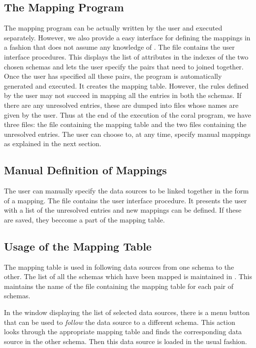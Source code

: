 \subsection{The Mapping Program}

The  mapping program can be actually written by the user
and executed separately. However, we also provide a easy interface for
defining the mappings in a fashion that does not assume any knowledge
of .  The file  contains the user
interface procedures.  This displays the list of attributes in the
indexes of the two chosen schemas and lets the user specify the pairs
that need to joined together. Once the user has specified all these
pairs, the  program is automatically generated and
executed.  It creates the mapping table. However, the rules defined by
the user may not succeed in mapping all the entries in both the
schemas. If there are any unresolved entries, these are dumped into
files whose names are given by the user. Thus at the end of the
execution of the coral program, we have three files: the file
containing the mapping table and the two files containing the
unresolved entries. The user can choose to, at any time, specify
manual mappings as explained in the next section.

\subsection{Manual Definition of Mappings}

The user can manually specify the data sources to be linked together
in the form of a mapping. The file  contains the
user interface procedure. It presents the user with a list of the
unresolved entries and new mappings can be defined. If these are
saved, they beccome a part of the mapping table.

\subsection{Usage of the Mapping Table}

The mapping table is used in following data sources from one schema to
the other. The list of all the schemas which have been mapped is
maintained in . This maintains the name of the
file containing the mapping table for each pair of schemas.

In the window displaying the list of selected data sources, there is a
menu button that can be used to {\em follow} the data source to a
different schema. This action looks through the appropriate mapping
table and finds the corresponding data source in the other
schema. Then this data source is loaded in the usual fashion.

